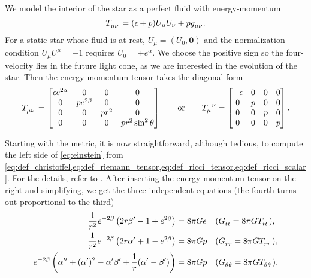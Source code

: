We model the interior of the star as a perfect fluid with energy-momentum \cite[equation 1.114]{ref:carroll}
\begin{equation}
	T\indices{_\mu_\nu} = (\epsilon+p) U_\mu U_\nu + p g\indices{_\mu_\nu}.
\end{equation}
For a static star whose fluid is at rest, $U_\mu = (U_0, \textbf{0})$ and the normalization condition $U_\mu U^\mu = -1$ requires $U_0 = \pm e^\alpha$.
We choose the positive sign so the four-velocity lies in the future light cone, as we are interested in the evolution of the star.
Then the energy-momentum tensor takes the diagonal form
\begin{equation}
T\indices{_\mu_\nu} =
\begin{bmatrix}
	\epsilon e^{2\alpha} & 0            & 0     & 0                   \\
	0                    & p e^{2\beta} & 0     & 0                   \\
	0                    & 0            & p r^2 & 0                   \\
	0                    & 0            & 0     & p r^2 \sin^2 \theta \\
\end{bmatrix}
\qquad \text{or} \qquad
T\indices{_\mu^\nu} =
\begin{bmatrix}
	-\epsilon & 0 & 0 & 0 \\
	0         & p & 0 & 0 \\
	0         & 0 & p & 0 \\
	0         & 0 & 0 & p \\
\end{bmatrix}
.
\label{eq:einstein_to_tov:T}
\end{equation}

Starting with the metric, it is now straightforward, although tedious, to compute the left side of \cref{eq:einstein} from \cref{eq:def_christoffel,eq:def_riemann_tensor,eq:def_ricci_tensor,eq:def_ricci_scalar}.
For the details, refer to \cite[equation 5.11-5.15]{ref:carroll}.
After inserting the energy-momentum tensor on the right and simplifying, we get the three independent equations
(the fourth turns out proportional to the third)
\begin{subequations}
\begin{align}
	\frac{1}{r^2} e^{-2 \beta} \left( 2 r \beta' - 1 + e^{2 \beta} \right)  &= 8 \pi G \epsilon
	&& (G\indices{_t_t} = 8 \pi G T\indices{_t_t})                     , \label{eq:einstein_to_tov:tt} \\
	\frac{1}{r^2} e^{-2 \beta} \left( 2 r \alpha' + 1 - e^{2 \beta} \right) &= 8 \pi G p
	&& (G\indices{_r_r} = 8 \pi G T\indices{_r_r})                     , \label{eq:einstein_to_tov:rr} \\
	e^{-2 \beta} \left( \alpha'' + (\alpha')^2 - \alpha' \beta' + \frac{1}{r} (\alpha' - \beta') \right) &= 8 \pi G p
	&& (G\indices{_\theta_\theta} = 8 \pi G T\indices{_\theta_\theta}) . \label{eq:einstein_to_tov:thetatheta}
\end{align}
\end{subequations}

